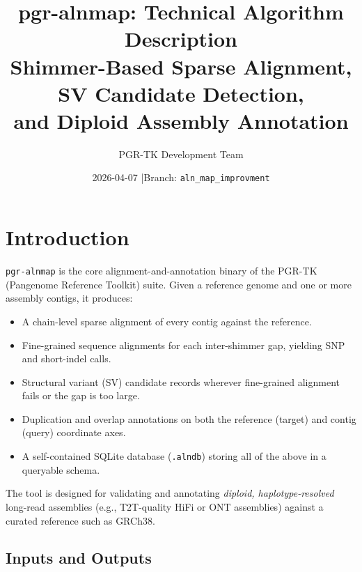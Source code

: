 \documentclass[11pt,a4paper]{article}
\title{
  \textbf{pgr-alnmap: Technical Algorithm Description}\\[0.5em]
  \large Shimmer-Based Sparse Alignment, SV Candidate Detection,\\
         and Diploid Assembly Annotation
}
\author{PGR-TK Development Team}
\date{2026-04-07 \quad|\quad Branch: \texttt{aln\_map\_improvment}}
\begin{document}
\maketitle
\tableofcontents
\newpage

\section{Introduction}
\label{sec:intro}

\texttt{pgr-alnmap} is the core alignment-and-annotation binary of the
PGR-TK (Pangenome Reference Toolkit) suite.
Given a reference genome and one or more assembly contigs, it produces:

\begin{itemize}[noitemsep]
  \item A chain-level sparse alignment of every contig against the reference.
  \item Fine-grained sequence alignments for each inter-shimmer gap, yielding
        SNP and short-indel calls.
  \item Structural variant (SV) candidate records wherever fine-grained alignment
        fails or the gap is too large.
  \item Duplication and overlap annotations on both the reference (target) and
        contig (query) coordinate axes.
  \item A self-contained SQLite database (\texttt{.alndb}) storing all of the above
        in a queryable schema.
\end{itemize}

The tool is designed for validating and annotating \emph{diploid, haplotype-resolved}
long-read assemblies (e.g., T2T-quality HiFi or ONT assemblies) against a curated
reference such as GRCh38.

\subsection{Inputs and Outputs}
\end{document}
